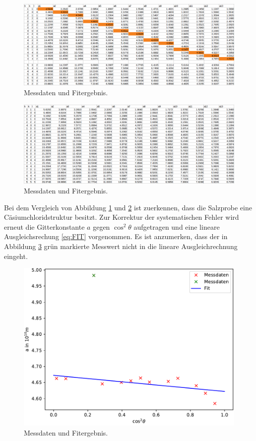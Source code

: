\begin{figure}
	\centering
	\includegraphics[angle=90,scale=0.75]{ressources/Caesiumchlorid.png}
	\caption{Messdaten und Fitergebnis.}
    \label{fig:C_excel}
\end{figure}


\begin{figure}
	\centering
	\includegraphics[angle=90,scale=0.75]{ressources/Strukturen.png}
	\caption{Messdaten und Fitergebnis.}
    \label{fig:A_excel}
\end{figure}

Bei dem Vergleich von Abbildung \ref{fig:C_excel} und \ref{fig:A_excel} ist zuerkennen, dass die Salzprobe eine Cäsiumchloridstruktur besitzt. Zur Korrektur der systematischen Fehler wird erneut die Gitterkonstante $a$ gegen $\cos^2{\theta}$ aufgetragen und eine lineare Ausgleichsrechung \eqref{eq:FIT} vorgenommen. Es ist anzumerken, dass der in Abbildung \ref{fig:plot5} grün markierte Messwert nicht in die lineare Ausgleichrechnung eingeht.

\begin{figure}
	\centering
	\includegraphics[scale=0.75]{build/Salz.pdf}
	\caption{Messdaten und Fitergebnis.}
    \label{fig:plot5}
\end{figure}

